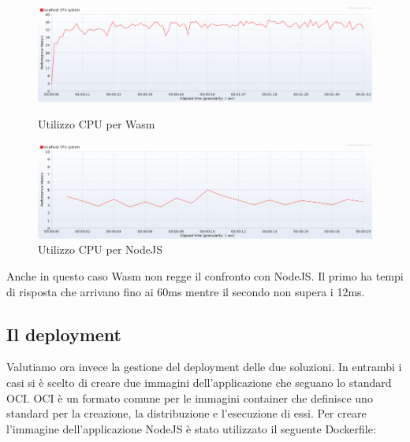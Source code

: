 \begin{figure}[H]
        \includegraphics[width=\linewidth]{chapters/3.poc/benchmarks_images/wasi_100_thread_1000_req_cpu.png}
        \caption{Utilizzo CPU per Wasm}\label{fig:100_thread_1000_req_wasi_cpu}
    \endminipage\hfill
        \includegraphics[width=\linewidth]{chapters/3.poc/benchmarks_images/node_100_thread_1000_req_cpu.png}
        \caption{Utilizzo CPU per NodeJS}\label{fig:100_thread_1000_req_node_cpu}
    \endminipage\hfill
\end{figure}

Anche in questo caso Wasm non regge il confronto con NodeJS. Il primo ha tempi di risposta che arrivano fino ai 60ms
mentre il secondo non supera i 12ms.

\subsection{Il deployment}
Valutiamo ora invece la gestione del deployment delle due soluzioni. In entrambi i casi si è scelto di creare due
immagini dell'applicazione che seguano lo standard OCI. OCI è un formato comune per le immagini container che definisce
uno standard per la creazione, la distribuzione e l'esecuzione di essi. Per creare l'immagine dell'applicazione NodeJS è
stato utilizzato il seguente Dockerfile: 

